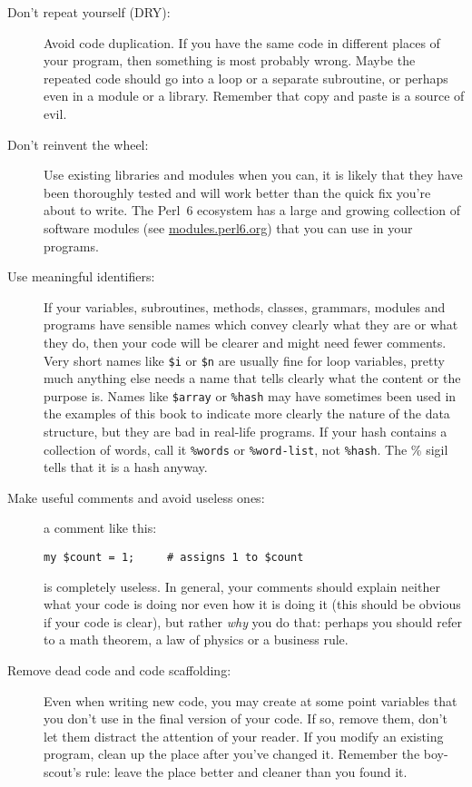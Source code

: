 \begin{description}

\item[Don't repeat yourself (DRY):] Avoid code duplication. 
If you have the same code in different places of your 
program, then something is most probably wrong. Maybe 
the repeated code should go into a loop or a separate 
subroutine, or perhaps even in a module or a library. 
Remember that copy and paste is a source of evil.

\item[Don't reinvent the wheel:] Use existing libraries 
and modules when you can, it is likely that they have 
been thoroughly tested and will work better than the 
quick fix you're about to write. The Perl~6 ecosystem 
has a large and growing collection of software modules 
(see \url{modules.perl6.org}) that you can use in your 
programs.

\item[Use meaningful identifiers:] If your variables, 
subroutines, methods, classes, grammars, modules 
and programs have sensible 
names which convey clearly what they are or what they do, 
then your code will be clearer and might need fewer 
comments. Very short names like \verb'$i' or \verb'$n' are 
usually fine for loop variables, pretty much anything else needs 
a name that tells clearly what the content or the purpose is. 
Names like \verb'$array' or \verb'%hash' may have sometimes been 
used in the examples of this book to indicate more clearly 
the nature of the data structure, but they are bad in 
real-life programs. If your hash contains a collection of 
words, call it \verb'%words' or \verb'%word-list', not 
\verb'%hash'. The \% sigil tells that it is a hash anyway.

\item[Make useful comments and avoid useless ones:] a 
comment like this:
\begin{verbatim}
my $count = 1;     # assigns 1 to $count
\end{verbatim}
is completely useless. In general, your comments should 
explain neither what your code is doing nor even how it is doing 
it (this should be obvious if your code is clear), but 
rather \emph{why} you do that: perhaps you should refer 
to a math theorem, a law of physics or a business rule.

\item[Remove dead code and code scaffolding:] Even when 
writing new code, you may create at some point variables 
that you don't use in the final version of your code. If so, 
remove them, don't let them distract the attention of your 
reader. If you modify an existing program, clean up the place 
after you've changed it. Remember the boy-scout's rule: 
leave the place better and cleaner than you found it.


\end{description}
